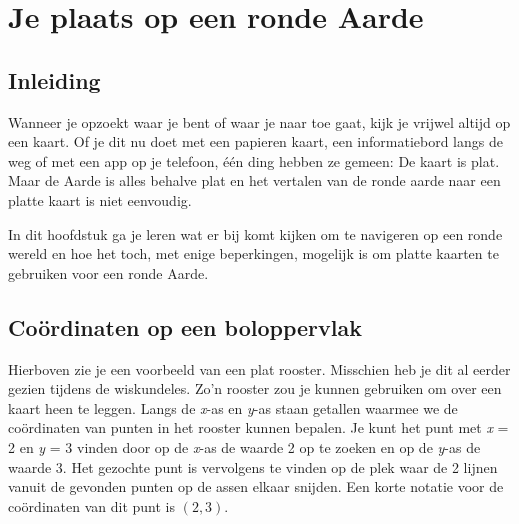 \chapter{Je plaats op een ronde Aarde}

\section{Inleiding}

Wanneer je opzoekt waar je bent of waar je naar toe gaat, kijk je vrijwel altijd op een kaart. Of je dit nu doet met een papieren kaart, een informatiebord langs de weg of met een app op je telefoon, \'e\'en ding hebben ze gemeen: De kaart is plat. Maar de Aarde is alles behalve plat en het vertalen van de ronde aarde naar een platte kaart is niet eenvoudig.

In dit hoofdstuk ga je leren wat er bij komt kijken om te navigeren op een ronde wereld en hoe het toch, met enige beperkingen, mogelijk is om platte kaarten te gebruiken voor een ronde Aarde.

\section{Co\"ordinaten op een boloppervlak}


Hierboven zie je een voorbeeld van een plat rooster. Misschien heb je dit al eerder gezien tijdens de wiskundeles. Zo'n rooster zou je kunnen gebruiken om over een kaart heen te leggen. Langs de \textit{x}-as en \textit{y}-as staan getallen waarmee we de co\"ordinaten van punten in het rooster kunnen bepalen. Je kunt het punt met \textit{x} = 2 en \textit{y} = 3 vinden door op de \textit{x}-as de waarde 2 op te zoeken en op de \textit{y}-as de waarde 3. Het gezochte punt is vervolgens te vinden op de plek waar de 2 lijnen vanuit de gevonden punten op de assen elkaar snijden. Een korte notatie voor de co\"ordinaten van dit punt is $(2, 3)$.

